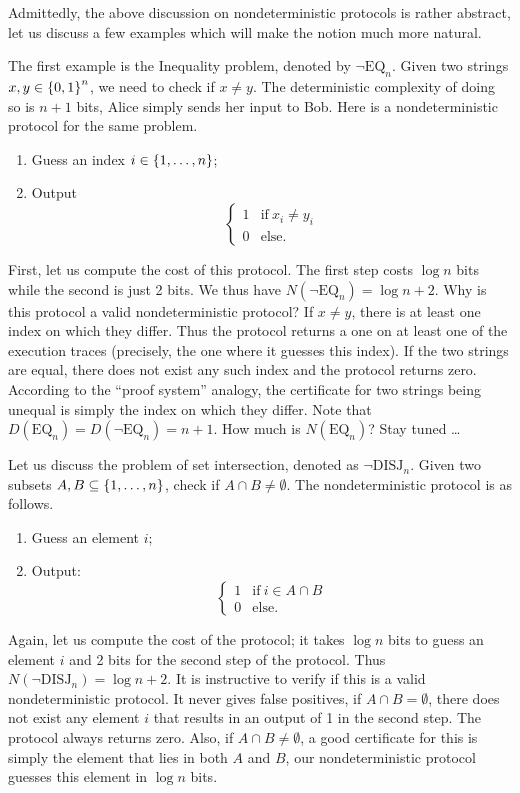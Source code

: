 \documentclass[letterpaper]{article}
\providecommand\cbrac[1]{\ensuremath \left\{#1\right\}}
\newcommand{\nDISJ}{\neg \mathrm{DISJ}}
\newcommand{\EQ}{\mathrm{EQ}}
\newcommand{\nEQ}{\neg \mathrm{EQ}}
\begin{document}
Admittedly, the above discussion on nondeterministic protocols is rather abstract, let us discuss a few examples which will make the notion much more natural.

\begin{example}
The first example is the Inequality problem, denoted by $\nEQ_n$. Given two strings $x, y \in \cbrac{0,1}^n$, we need to check if $x \neq y$. The deterministic complexity of doing so is $n+1$ bits, Alice simply sends her input to Bob. Here is a nondeterministic protocol for the same problem.
\begin{enumerate}
    \item Guess an index $i \in \cbrac{1, \ldots, n}$;
    \item Output
         $$
            \begin{cases}
            1 & \mathrm{if}\ x_i \neq y_i\\
            0 & \mathrm{else.}
            \end{cases}
         $$
\end{enumerate}
First, let us compute the cost of this protocol. The first step costs $\log n$ bits while the second is just 2 bits. We thus have $N(\nEQ_n) = \log n + 2$. Why is this protocol a valid nondeterministic protocol? If $x \neq y$, there is at least one index on which they differ. Thus the protocol returns a one on at least one of the execution traces (precisely, the one where it guesses this index). If the two strings are equal, there does not exist any such index and the protocol returns zero. According to the ``proof system'' analogy, the certificate for two strings being unequal is simply the index on which they differ. Note that $D(\EQ_n) = D(\nEQ_n) = n+1$. How much is $N(\EQ_n)$? Stay tuned \ldots
\end{example}

\begin{example}
Let us discuss the problem of set intersection, denoted as $\nDISJ_n$. Given two subsets $A, B \subseteq \cbrac{1, \ldots, n}$, check if $A \cap B \neq \emptyset$. The nondeterministic protocol is as follows.
\begin{enumerate}
    \item Guess an element $i$;
    \item Output:
         $$
            \begin{cases}
            1 & \mathrm{if}\ i \in A \cap B\\
            0 & \mathrm{else.}
            \end{cases}
         $$
\end{enumerate}
Again, let us compute the cost of the protocol; it takes $\log n$ bits to guess an element $i$ and 2 bits for the second step of the protocol. Thus $N(\nDISJ_n) = \log n + 2$. It is instructive to verify if this is a valid nondeterministic protocol. It never gives false positives, if $A \cap B = \emptyset$, there does not exist any element $i$ that results in an output of 1 in the second step. The protocol always returns zero. Also, if $A \cap B \neq \emptyset$, a good certificate for this is simply the element that lies in both $A$ and $B$, our nondeterministic protocol guesses this element in $\log n$ bits.
\end{example}
\end{document}
